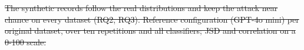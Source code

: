 \documentclass[conference]{IEEEtran}
\providecommand{\DIFdeltex}[1]{{\protect\color{red}\sout{#1}}}                      %
\providecommand{\DIFdelbegin}{} %
\providecommand{\DIFdelFL}[1]{\DIFdel{#1}} %
\providecommand{\DIFdel}[1]{\texorpdfstring{\DIFdeltex{#1}}{}} %
\newcommand{\DIFscaledelfig}{0.5}
\newlength{\DIFdelgraphicswidth} %
\newlength{\DIFdelgraphicsheight} %
\newcommand{\DIFdelincludegraphics}[2][]{%
\sbox{\DIFdelgraphicsbox}{\DIFOincludegraphics[#1]{#2}}%
\settoboxwidth{\DIFdelgraphicswidth}{\DIFdelgraphicsbox} %
\settoboxtotalheight{\DIFdelgraphicsheight}{\DIFdelgraphicsbox} %
\scalebox{\DIFscaledelfig}{%
\parbox[b]{\DIFdelgraphicswidth}{\usebox{\DIFdelgraphicsbox}\\[-\baselineskip] \rule{\DIFdelgraphicswidth}{0em}}\llap{\resizebox{\DIFdelgraphicswidth}{\DIFdelgraphicsheight}{%
\setlength{\unitlength}{\DIFdelgraphicswidth}%
\begin{picture}(1,1)%
\thicklines\linethickness{2pt} %
{\color[rgb]{1,0,0}\put(0,0){\framebox(1,1){}}}%
{\color[rgb]{1,0,0}\put(0,0){\line( 1,1){1}}}%
{\color[rgb]{1,0,0}\put(0,1){\line(1,-1){1}}}%
\end{picture}%
}\hspace*{3pt}}} %
} %
\DeclareRobustCommand{\DIFdelbegin}{\DIFOdelbegin \let\includegraphics\DIFdelincludegraphics} %
\begin{document}
\DIFdelbegin %
{%
\DIFdelFL{The synthetic records follow the real distributions and keep the attack near chance on every dataset (RQ2, RQ3). Reference configuration (GPT-4o mini) per original dataset, over ten repetitions and all classifiers; JSD and correlation on a 0-100 scale.}}
\end{document}
